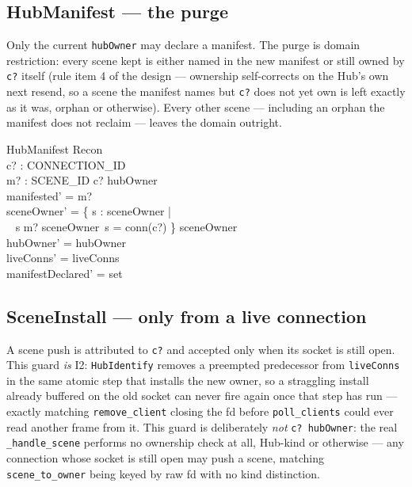 \documentclass[a4paper,10pt,fleqn]{article}
\begin{document}
\subsection{HubManifest --- the purge}

Only the current \texttt{hubOwner} may declare a manifest.  The purge is
domain restriction: every scene kept is either named in the new manifest
or still owned by \texttt{c?} itself (rule item 4 of the design ---
ownership self-corrects on the Hub's own next resend, so a scene the
manifest names but \texttt{c?} does not yet own is left exactly as it
was, orphan or otherwise).  Every other scene --- including an orphan the
manifest does not reclaim --- leaves the domain outright.

\begin{schema}{HubManifest}
  \Delta Recon \\
  c? : CONNECTION\_ID \\
  m? : \power SCENE\_ID
\where
  c? \in hubOwner \\
  manifested' = m? \\
  sceneOwner' = \{ s : \dom sceneOwner | \\
  \quad~ s \in m? \lor sceneOwner~s = conn(c?) \} \dres sceneOwner \\
  hubOwner' = hubOwner \\
  liveConns' = liveConns \\
  manifestDeclared' = set
\end{schema}

\subsection{SceneInstall --- only from a live connection}

A scene push is attributed to \texttt{c?} and accepted only when its
socket is still open.  This guard \emph{is} I2: \texttt{HubIdentify}
removes a preempted predecessor from \texttt{liveConns} in the same
atomic step that installs the new owner, so a straggling install already
buffered on the old socket can never fire again once that step has run
--- exactly matching \texttt{remove\_client} closing the fd before
\texttt{poll\_clients} could ever read another frame from it.  This
guard is deliberately \emph{not} \texttt{c? \in hubOwner}: the real
\texttt{\_handle\_scene} performs no ownership check at all, Hub-kind or
otherwise --- any connection whose socket is still open may push a
scene, matching \texttt{scene\_to\_owner} being keyed by raw fd with no
kind distinction.
\end{document}
